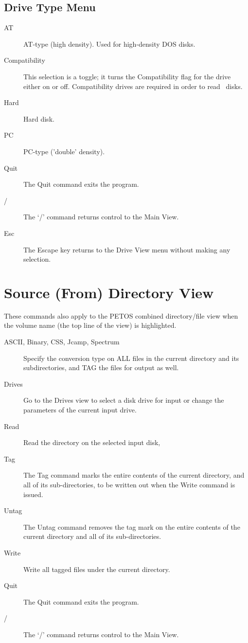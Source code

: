 \begin{itemize}
\subsection{Drive Type Menu}
\begin{description}
\item[AT]\nl
           AT-type (high density).  Used for high-density DOS disks.
\item[Compatibility]\nl
           This selection is a toggle; it turns the Compatibility flag
           for the drive either on or off.  Compatibility drives are
	   required in order to read \OS\ disks.
\item[Hard]\nl
           Hard disk.
\item[PC]\nl
           PC-type ('double' density).
\item[Quit]\nl
           The Quit command exits the program.
\item[/]\nl
           The `/' command returns control to the Main View.
\item[Esc]\nl
           The Escape key returns to the Drive View menu without making
           any selection.

\end{description}

\section{Source (From) Directory View}
These commands also apply to the PETOS combined directory/file view
when the volume name (the top line of the view) is highlighted.

\noindent
\begin{description}
\item[ASCII, Binary, CSS, Jcamp, Spectrum]\nl
           Specify the conversion type on ALL files in the current
           directory and its subdirectories, and TAG the files for
           output as well.
\item[Drives]\nl
           Go to the Drives view to select a disk drive for input
           or change the parameters of the current input drive.
\item[Read]\nl
           Read the directory on the selected input disk,
\item[Tag]\nl
           The Tag command marks the entire contents of the current
           directory, and all of its sub-directories, to be written
           out when the Write command is issued.
\item[Untag]\nl
           The Untag command removes the tag mark on the entire contents
           of the current directory and all of its sub-directories.
\item[Write]\nl
           Write all tagged files under the current directory.
\item[Quit]\nl
           The Quit command exits the program.
\item[/]\nl
           The `/' command returns control to the Main View.
\end{description}



\end{itemize}
